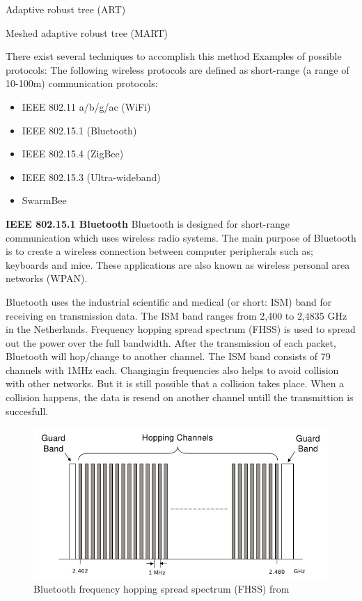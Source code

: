 \documentclass[10pt,a4paper]{article}
\begin{document}
Adaptive robust tree (ART)


Meshed adaptive robust tree (MART)



There exist several techniques to accomplish this method 
Examples of possible protocols:
The following wireless protocols are defined as short-range (a range of 10-100m) communication protocols:
\begin{itemize}
\setlength\itemsep{0em}
    \item IEEE 802.11 a/b/g/ac (WiFi) \cite{IEEE80211timeline}
    \item IEEE 802.15.1 (Bluetooth)
    \item IEEE 802.15.4 (ZigBee)
    \item IEEE 802.15.3 (Ultra-wideband)
    \item SwarmBee
\end{itemize}

\textbf{IEEE 802.15.1 Bluetooth}
Bluetooth is designed for short-range communication which uses wireless radio systems. The main purpose of Bluetooth is to create a wireless connection between computer peripherals such as; keyboards and mice. These applications are also known as wireless personal area networks (WPAN). \cite{comparitivestudywirelessprotocols} 

Bluetooth uses the industrial scientific and medical (or short: ISM) band for receiving en transmission data. The ISM band ranges from 2,400 to 2,4835 GHz in the Netherlands. \cite{frequencyandsnetherlands} Frequency hopping spread spectrum (FHSS) is used to spread out the power over the full bandwidth. After the transmission of each packet, Bluetooth will hop/change to another channel. The ISM band consists of 79 channels with 1MHz each. Changingin frequencies also helps to avoid collision with other networks. But it is still possible that a collision takes place. When a collision happens, the data is resend on another channel untill the transmittion is succesfull.

\begin{figure}[H]
   \centering
   \includegraphics[width=1\textwidth]{bluetoothfh}
   \caption{Bluetooth frequency hopping spread spectrum (FHSS) from \cite{bluetoothspectrum}}
   \label{fig:bluetoothfh}
\end{figure}
\end{document}
